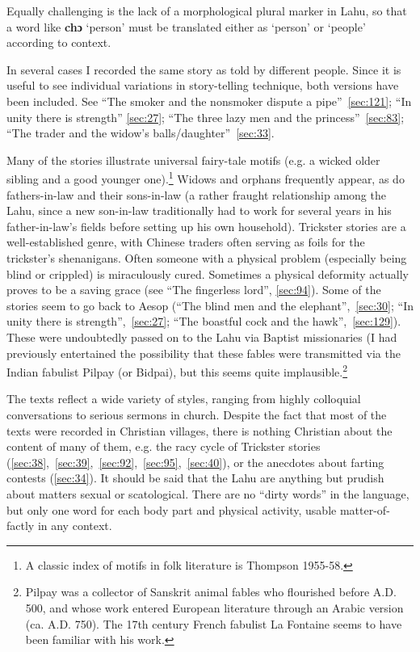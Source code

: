 Equally challenging is the lack of a morphological plural marker in
Lahu, so that a word like \textbf{chɔ} `person' must be translated
either as `person' or `people' according to context.

In several cases I recorded the same story as told by different people.
Since it is useful to see individual variations in story-telling
technique, both versions have been included. See ``The smoker and the
nonsmoker dispute a pipe''~\ref{sec:121}; ``In unity there is strength'' \ref{sec:27};
``The three lazy men and the princess''~\ref{sec:83}; ``The trader and the
widow's balls/daughter''~\ref{sec:33}.

Many of the stories illustrate universal fairy-tale motifs (e.g. a
wicked older sibling and a good younger one).\footnote{A classic index
  of motifs in folk literature is Thompson 1955-58.} Widows and
orphans frequently appear, as do fathers-in-law and their sons-in-law
(a rather fraught relationship among the Lahu, since a new son-in-law
traditionally had to work for several years in his father-in-law's
fields before setting up his own household). Trickster stories are a
well-established genre, with Chinese traders often serving as foils
for the trickster's shenanigans. Often someone with a physical problem
(especially being blind or crippled) is miraculously cured. Sometimes
a physical deformity actually proves to be a saving grace (see ``The
fingerless lord'', \ref{sec:94}). Some of the stories seem to go back
to Aesop (``The blind men and the elephant'',~\ref{sec:30}; ``In unity
there is strength'',~\ref{sec:27}; ``The boastful cock and the
hawk'',~\ref{sec:129}). These were undoubtedly passed on to the Lahu via Baptist
missionaries (I had previously entertained the possibility that these
fables were transmitted via the Indian fabulist Pilpay (or Bidpai),
but this seems quite implausible.\footnote{Pilpay was a collector of
  Sanskrit animal fables who flourished before A.D. 500, and whose
  work entered European literature through an Arabic version
  (ca. A.D. 750). The 17th century French fabulist La Fontaine seems
  to have been familiar with his work.}


\protect\hypertarget{anchor}{}{}The texts reflect a wide variety of
styles, ranging from highly colloquial conversations to serious
sermons in church. Despite the fact that most of the texts were
recorded in Christian villages, there is nothing Christian about the
content of many of them, e.g. the racy cycle of Trickster stories
(\ref{sec:38},~\ref{sec:39},~\ref{sec:92},~\ref{sec:95},~\ref{sec:40}),
or the anecdotes about farting contests (\ref{sec:34}). It should be
said that the Lahu are anything but prudish about matters sexual or
scatological. There are no ``dirty words'' in the language, but only
one word for each body part and physical activity, usable
matter-of-factly in any context.

